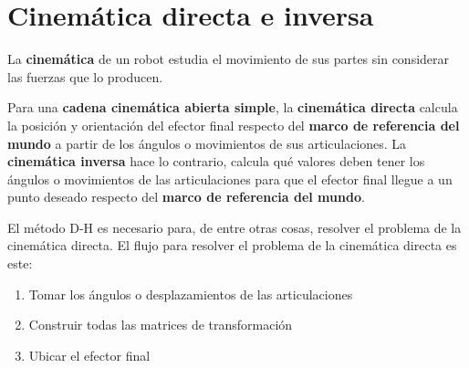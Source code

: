 \section{Cinemática directa e inversa}
La \textbf{cinemática} de un robot estudia el movimiento de sus partes sin considerar las fuerzas que lo producen. 

Para una \textbf{cadena cinemática abierta simple}, la \textbf{cinemática directa} calcula la posición y orientación del efector final respecto del \textbf{marco de referencia del mundo} a partir de los ángulos o movimientos de sus articulaciones. La \textbf{cinemática inversa} hace lo contrario, calcula qué valores deben tener los ángulos o movimientos de las articulaciones para que el efector final llegue a un punto deseado respecto del \textbf{marco de referencia del mundo}. %

El método D-H es necesario para, de entre otras cosas, resolver el problema de la cinemática directa. El flujo para resolver el problema de la cinemática directa es este:
\begin{enumerate}
    \item Tomar los ángulos o desplazamientos de las articulaciones
    \item Construir todas las matrices de transformación
    \item Ubicar el efector final 
\end{enumerate}